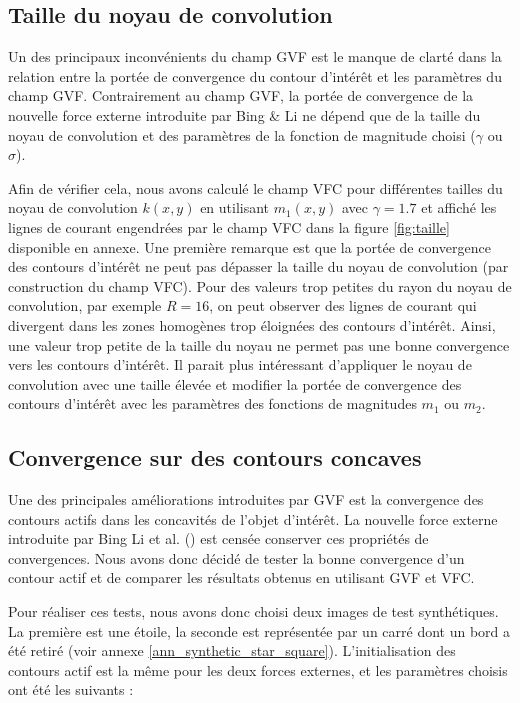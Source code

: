 \subsection{Taille du noyau de convolution}
Un des principaux inconvénients du champ GVF est le manque de clarté dans la relation entre la portée de convergence du contour d'intérêt et les paramètres du champ GVF. Contrairement au champ GVF, la portée de convergence de la nouvelle force externe introduite par Bing \& Li ne dépend que de la taille du noyau de convolution et des paramètres de la fonction de magnitude choisi ($\gamma$ ou $\sigma$).   

Afin de vérifier cela, nous avons calculé le champ VFC pour différentes tailles du noyau de convolution $k(x,y)$ en utilisant $m_1(x,y)$ avec $\gamma=1.7$ et affiché les lignes de courant engendrées par le champ VFC dans la figure \ref{fig:taille} disponible en annexe. Une première remarque est que la portée de convergence des contours d'intérêt ne peut pas dépasser la taille du noyau de convolution (par construction du champ VFC). Pour des valeurs trop petites du rayon du noyau de convolution, par exemple $R=16$, on peut observer des lignes de courant qui divergent dans les zones homogènes trop éloignées des contours d'intérêt. Ainsi, une valeur trop petite de la taille du noyau ne permet pas une bonne convergence vers les contours d'intérêt. Il parait plus intéressant d'appliquer le noyau de convolution avec une taille élevée et modifier la portée de convergence des contours d'intérêt avec les paramètres des fonctions de magnitudes $m_1$ ou $m_2$.


\subsection{Convergence sur des contours concaves}
Une des principales améliorations introduites par GVF est la convergence des contours actifs dans les concavités de l'objet d'intérêt. La nouvelle force externe introduite par Bing Li et al. (\cite{vfc}) est censée conserver ces propriétés de convergences. Nous avons donc décidé de tester la bonne convergence d'un contour actif et de comparer les résultats obtenus en utilisant GVF et VFC.

Pour réaliser ces tests, nous avons donc choisi deux images de test synthétiques. La première est une étoile, la seconde est représentée par un carré dont un bord a été retiré (voir annexe \ref{ann_synthetic_star_square}). L'initialisation des contours actif est la même pour les deux forces externes, et les paramètres choisis ont été les suivants :\\

